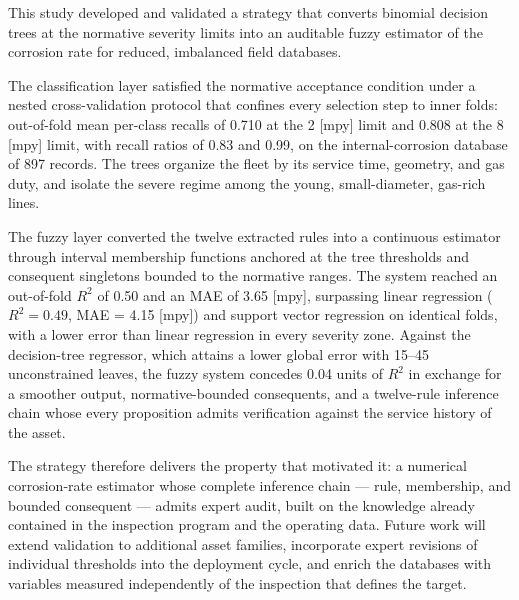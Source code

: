 This study developed and validated a strategy that converts binomial decision trees at the normative severity limits into an auditable fuzzy estimator of the corrosion rate for reduced, imbalanced field databases.

The classification layer satisfied the normative acceptance condition under a nested cross-validation protocol that confines every selection step to inner folds: out-of-fold mean per-class recalls of 0.710 at the 2 [mpy] limit and 0.808 at the 8 [mpy] limit, with recall ratios of 0.83 and 0.99, on the internal-corrosion database of 897 records. The trees organize the fleet by its service time, geometry, and gas duty, and isolate the severe regime among the young, small-diameter, gas-rich lines.

The fuzzy layer converted the twelve extracted rules into a continuous estimator through interval membership functions anchored at the tree thresholds and consequent singletons bounded to the normative ranges. The system reached an out-of-fold $R^2$ of 0.50 and an MAE of 3.65 [mpy], surpassing linear regression ($R^2 = 0.49$, MAE = 4.15 [mpy]) and support vector regression on identical folds, with a lower error than linear regression in every severity zone. Against the decision-tree regressor, which attains a lower global error with 15--45 unconstrained leaves, the fuzzy system concedes 0.04 units of $R^2$ in exchange for a smoother output, normative-bounded consequents, and a twelve-rule inference chain whose every proposition admits verification against the service history of the asset.

The strategy therefore delivers the property that motivated it: a numerical corrosion-rate estimator whose complete inference chain --- rule, membership, and bounded consequent --- admits expert audit, built on the knowledge already contained in the inspection program and the operating data. Future work will extend validation to additional asset families, incorporate expert revisions of individual thresholds into the deployment cycle, and enrich the databases with variables measured independently of the inspection that defines the target.